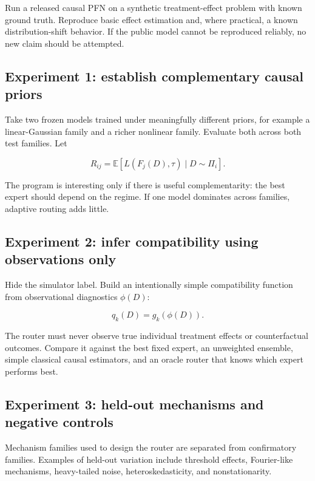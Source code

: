 \documentclass[11pt]{article}
\begin{document}
Run a released causal PFN on a synthetic treatment-effect problem with known ground truth. Reproduce basic effect estimation and, where practical, a known distribution-shift behavior. If the public model cannot be reproduced reliably, no new claim should be attempted.

\subsection*{Experiment 1: establish complementary causal priors}

Take two frozen models trained under meaningfully different priors, for example a linear-Gaussian family and a richer nonlinear family. Evaluate both across both test families. Let

\begin{equation}
R_{ij}=\mathbb{E}\left[L(F_j(D),\tau)\mid D\sim\Pi_i\right].
\end{equation}

The program is interesting only if there is useful complementarity: the best expert should depend on the regime. If one model dominates across families, adaptive routing adds little.

\subsection*{Experiment 2: infer compatibility using observations only}

Hide the simulator label. Build an intentionally simple compatibility function from observational diagnostics $\phi(D)$:

\begin{equation}
q_k(D)=g_k(\phi(D)).
\end{equation}

The router must never observe true individual treatment effects or counterfactual outcomes. Compare it against the best fixed expert, an unweighted ensemble, simple classical causal estimators, and an oracle router that knows which expert performs best.

\subsection*{Experiment 3: held-out mechanisms and negative controls}

Mechanism families used to design the router are separated from confirmatory families. Examples of held-out variation include threshold effects, Fourier-like mechanisms, heavy-tailed noise, heteroskedasticity, and nonstationarity.
\end{document}

